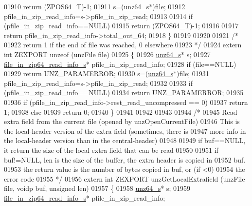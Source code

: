 \begin{DoxyCode}
01910         \textcolor{keywordflow}{return} (ZPOS64\_T)-1;
01911     s=(\hyperlink{structunz64__s}{unz64\_s}*)file;
01912     pfile\_in\_zip\_read\_info=s->pfile\_in\_zip\_read;
01913 
01914     \textcolor{keywordflow}{if} (pfile\_in\_zip\_read\_info==NULL)
01915         \textcolor{keywordflow}{return} (ZPOS64\_T)-1;
01916 
01917     \textcolor{keywordflow}{return} pfile\_in\_zip\_read\_info->total\_out\_64;
01918 \}
01919 
01920 
01921 \textcolor{comment}{/*}
01922 \textcolor{comment}{  return 1 if the end of file was reached, 0 elsewhere}
01923 \textcolor{comment}{*/}
01924 \textcolor{keyword}{extern} \textcolor{keywordtype}{int} ZEXPORT unzeof (unzFile file)
01925 \{
01926     \hyperlink{structunz64__s}{unz64\_s}* s;
01927     \hyperlink{structfile__in__zip64__read__info__s}{file\_in\_zip64\_read\_info\_s}* pfile\_in\_zip\_read\_info;
01928     \textcolor{keywordflow}{if} (file==NULL)
01929         \textcolor{keywordflow}{return} UNZ\_PARAMERROR;
01930     s=(\hyperlink{structunz64__s}{unz64\_s}*)file;
01931     pfile\_in\_zip\_read\_info=s->pfile\_in\_zip\_read;
01932 
01933     \textcolor{keywordflow}{if} (pfile\_in\_zip\_read\_info==NULL)
01934         \textcolor{keywordflow}{return} UNZ\_PARAMERROR;
01935 
01936     \textcolor{keywordflow}{if} (pfile\_in\_zip\_read\_info->rest\_read\_uncompressed == 0)
01937         \textcolor{keywordflow}{return} 1;
01938     \textcolor{keywordflow}{else}
01939         \textcolor{keywordflow}{return} 0;
01940 \}
01941 
01942 
01943 
01944 \textcolor{comment}{/*}
01945 \textcolor{comment}{Read extra field from the current file (opened by unzOpenCurrentFile)}
01946 \textcolor{comment}{This is the local-header version of the extra field (sometimes, there is}
01947 \textcolor{comment}{more info in the local-header version than in the central-header)}
01948 \textcolor{comment}{}
01949 \textcolor{comment}{  if buf==NULL, it return the size of the local extra field that can be read}
01950 \textcolor{comment}{}
01951 \textcolor{comment}{  if buf!=NULL, len is the size of the buffer, the extra header is copied in}
01952 \textcolor{comment}{    buf.}
01953 \textcolor{comment}{  the return value is the number of bytes copied in buf, or (if <0)}
01954 \textcolor{comment}{    the error code}
01955 \textcolor{comment}{*/}
01956 \textcolor{keyword}{extern} \textcolor{keywordtype}{int} ZEXPORT unzGetLocalExtrafield (unzFile file, voidp buf, \textcolor{keywordtype}{unsigned} len)
01957 \{
01958     \hyperlink{structunz64__s}{unz64\_s}* s;
01959     \hyperlink{structfile__in__zip64__read__info__s}{file\_in\_zip64\_read\_info\_s}* pfile\_in\_zip\_read\_info;

\end{DoxyCode}
